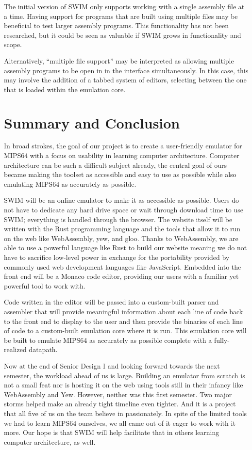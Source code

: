 \documentclass[
    paper=letter,
    parskip=half,
    fontsize=12pt,
    titlepage=firstiscover,
    toc=bibliography,
    numbers=endperiod
]{scrartcl}
\let\oldsection\section
\renewcommand{\section}{\newpage\oldsection}
\begin{document}
The initial version of SWIM only supports working with a single assembly
file at a time. Having support for programs that are built using
multiple files may be beneficial to test larger assembly programs. This
functionality has not been researched, but it could be seen as valuable
if SWIM grows in functionality and scope.

Alternatively, ``multiple file support'' may be interpreted as allowing
multiple assembly programs to be open in in the interface
simultaneously. In this case, this may involve the addition of a tabbed
system of editors, selecting between the one that is loaded within the
emulation core.

\section{Summary and Conclusion}

In broad strokes, the goal of our project is to create a user-friendly
emulator for MIPS64 with a focus on usability in learning computer
architecture. Computer architecture can be such a difficult subject
already, the central goal of ours became making the toolset as
accessible and easy to use as possible while also emulating MIPS64 as
accurately as possible.

SWIM will be an online emulator to make it as accessible as possible.
Users do not have to dedicate any hard drive space or wait through
download time to use SWIM; everything is handled through the browser.
The website itself will be written with the Rust programming language
and the tools that allow it to run on the web like WebAssembly, yew, and
gloo. Thanks to WebAssembly, we are able to use a powerful language like
Rust to build our website meaning we do not have to sacrifice low-level
power in exchange for the portability provided by commonly used web
development languages like JavaScript. Embedded into the front end will
be a Monaco code editor, providing our users with a familiar yet
powerful tool to work with.

Code written in the editor will be passed into a custom-built parser and
assembler that will provide meaningful information about each line of
code back to the front end to display to the user and then provide the
binaries of each line of code to a custom-built emulation core where it
is run. This emulation core will be built to emulate MIPS64 as
accurately as possible complete with a fully-realized datapath.

Now at the end of Senior Design I and looking forward towards the next
semester, the workload ahead of us is large. Building an emulator from
scratch is not a small feat nor is hosting it on the web using tools
still in their infancy like WebAssembly and Yew. However, neither was
this first semester. Two major storms helped make an already tight
timeline even tighter. And it is a project that all five of us on the
team believe in passionately. In spite of the limited tools we had to
learn MIPS64 ourselves, we all came out of it eager to work with it
more. Our hope is that SWIM will help facilitate that in others learning
computer architecture, as well.

\printbibliography
\end{document}
